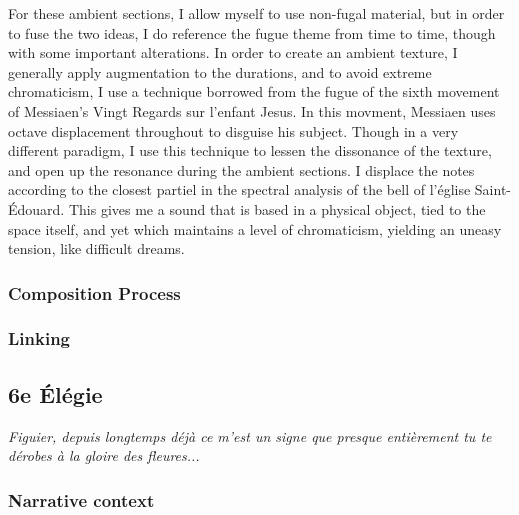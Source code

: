 \documentclass[12pt,twoside,maitrise]{dms}
\theoremstyle{definition}
\begin{document}
For these ambient sections, I allow myself to use non-fugal material, but in order to fuse the two ideas, I do reference the fugue theme from time to time, though with some important alterations.
In order to create an ambient texture, I generally apply augmentation to the durations, and to avoid extreme chromaticism, I use a technique borrowed from the fugue of the sixth movement of Messiaen's Vingt Regards sur l'enfant Jesus.
In this movment, Messiaen uses octave displacement throughout to disguise his subject.
Though in a very different paradigm, I use this technique to lessen the dissonance of the texture, and open up the resonance during the ambient sections.
I displace the notes according to the closest partiel in the spectral analysis of the bell of l'église Saint-Édouard.
This gives me a sound that is based in a physical object, tied to the space itself, and yet which maintains a level of chromaticism, yielding an uneasy tension, like difficult dreams.

\subsubsection{Composition Process}

\subsubsection{Linking}

\subsection{6e Élégie}

\epigraph{\textit{Figuier, depuis longtemps déjà ce m'est un signe que presque entièrement tu te dérobes à la gloire des fleures...}}{}

\subsubsection{Narrative context}
\end{document}
